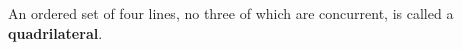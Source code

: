 An ordered set of four lines, no three of which are concurrent, is called a \textbf{quadrilateral}.
